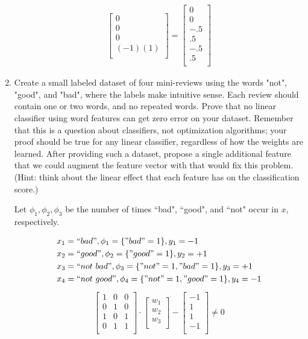 \documentclass[10pt]{article}
\begin{document}
\begin{enumerate}[label=(\alph*)]
\begin{align*}
\begin{bmatrix}
  0\\
  0\\
  0\\
  (-1)(1)\\
  \end{bmatrix} = \begin{bmatrix}
  0\\
  0\\
  -.5\\
  .5\\
  -.5\\
  .5\\
  \end{bmatrix}
  \end{align*}
  
  \item Create a small labeled dataset of four mini-reviews using the words "not", "good", and "bad", where the labels make intuitive sense. Each review should contain one or two words, and no repeated words. Prove that no linear classifier using word features can get zero error on your dataset. Remember that this is a question about classifiers, not optimization algorithms; your proof should be true for any linear classifier, regardless of how the weights are learned.
After providing such a dataset, propose a single additional feature that we could augment the feature vector with that would fix this problem. (Hint: think about the linear effect that each feature has on the classification score.)

Let $\phi_1, \phi_2, \phi_3$ be the number of times ``bad", ``good", and ``not" occur in $x$, respectively.  
  
  \begin{align*}
  x_1 &= ``bad", \phi_1 = \{ "bad" = 1 \}, y_1 = -1\\
  x_2 &=``good", \phi_2 = \{ "good" = 1 \}, y_2 = +1\\
  x_3 &=``not\ bad", \phi_3 = \{ "not" = 1, "bad" = 1 \}, y_3 = +1\\
  x_4 &= ``not\ good", \phi_4 = \{ "not" = 1, "good" = 1 \}, y_4 = -1\\
  \end{align*}
  \begin{align*}
  \begin{bmatrix}
  1 & 0 & 0\\
  0 & 1 & 0\\
  1 & 0 & 1\\
  0 & 1 & 1\\
  \end{bmatrix} \cdot \begin{bmatrix}
  w_1\\
  w_2\\
  w_3\\
  \end{bmatrix} - \begin{bmatrix}
  -1\\
  1\\
  1\\
  -1\\
  \end{bmatrix} \neq 0
  \end{align*}
  

\end{enumerate}
\end{document}
